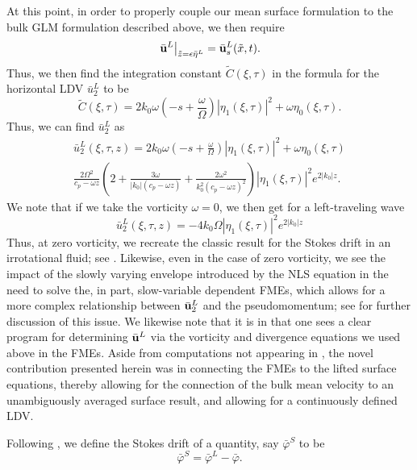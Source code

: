 \documentclass{JFM_Style/jfm}
\begin{document}
At this point, in order to properly couple our mean surface formulation to the bulk GLM formulation described above, we then require
\[
\left.\bar{{\bf u}}^{L}\right|_{\tilde{z}=\epsilon \bar{\eta}^{L}} = \bar{{\bf u}}^{L}_{s}(\tilde{x},t).
\]
Thus, we then find the integration constant $\tilde{C}(\xi,\tau)$ in the formula for the horizontal LDV $\bar{u}^{L}_{2}$ to be 
\[
\tilde{C}(\xi,\tau) = 2k_{0}\omega\left(-s + \frac{\omega}{\Omega} \right)|\eta_{1}(\xi,\tau)|^{2} + \omega \eta_{0}(\xi,\tau).
\]
Thus, we can find $\bar{u}_{2}^{L}$ as
\begin{multline*}
\bar{u}^{L}_{2}(\xi,\tau,z) = 2k_{0}\omega\left(-s + \frac{\omega}{\Omega} \right)|\eta_{1}(\xi,\tau)|^{2} + \omega \eta_{0}(\xi,\tau) \\
\frac{2\Omega^{2} }{c_{p}-\omega z}\left( 2 + \frac{3\omega}{|k_{0}|(c_{p}-\omega z)}+\frac{2\omega^{2}}{k_{0}^{2}(c_{p}-\omega z)^{2}}\right)|\eta_{1}(\xi,\tau)|^{2} e^{2|k_{0}|z}.
\end{multline*}
We note that if we take the vorticity $\omega=0$, we then get for a left-traveling wave
\[
\bar{u}^{L}_{2}(\xi,\tau,z) = -4k_{0}\Omega|\eta_{1}(\xi,\tau)|^{2}e^{2|k_{0}|z}
\]
Thus, at zero vorticity, we recreate the classic result for the Stokes drift in an irrotational fluid; see \cite{longuet}.  Likewise, even in the case of zero vorticity, we see the impact of the slowly varying envelope introduced by the NLS equation in the need to solve the, in part, slow-variable dependent FMEs, which allows for a more complex relationship between $\bar{{\bf u}}^{L}_{2}$ and the pseudomomentum; see \cite{buhler} for further discussion of this issue.  We likewise note that it is in \cite{buhler} that one sees a clear program for determining $\bar{{\bf u}}^{L}$ via the vorticity and divergence equations we used above in the FMEs.  Aside from computations not appearing in \cite{buhler}, the novel contribution presented herein was in connecting the FMEs to the lifted surface equations, thereby allowing for the connection of the bulk mean velocity to an unambiguously averaged surface result, and allowing for a continuously defined LDV.  

Following \cite{andrews}, we define the Stokes drift of a quantity, say $\bar{\varphi}^{S}$ to be 
\[
\bar{\varphi}^{S} = \bar{\varphi}^{L} - \bar{\varphi}.
\]
\end{document}
